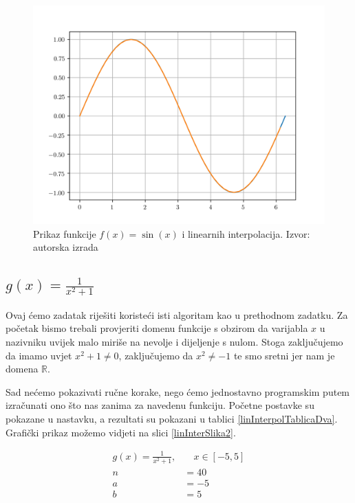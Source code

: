 \documentclass[12pt,a4paper]{report}
\begin{document}
		\begin{figure}[H]
			\includegraphics[width=\textwidth]{slike/usporedbaLinearneInterpolacijeSin.png}
			\caption{Prikaz funkcije $f(x)=\sin (x)$ i linearnih interpolacija. Izvor: autorska izrada}
		\end{figure}
		\subsection{$g(x)=\frac{1}{x^2 +1}$}
			Ovaj ćemo zadatak riješiti koristeći isti algoritam kao u prethodnom zadatku. Za početak bismo trebali provjeriti domenu funkcije s obzirom da varijabla $x$ u nazivniku uvijek malo miriše na nevolje i dijeljenje s nulom. Stoga zaključujemo da imamo uvjet $x^2+1\neq0$, zaključujemo da $x^2\neq-1$ te smo sretni jer nam je domena $\mathbb{R}$.
			
			Sad nećemo pokazivati ručne korake, nego ćemo jednostavno programskim putem izračunati ono što nas zanima za navedenu funkciju. Početne postavke su pokazane u nastavku, a rezultati su pokazani u tablici \ref{linInterpolTablicaDva}. Grafički prikaz možemo vidjeti na slici \ref{linInterSlika2}.
			
			\begin{align*}
			g(x)=\frac{1}{x^2 +1},& \quad x\in [-5,5]\\
			n&=40\\
			a&=-5\\
			b&=5\\
			\end{align*}
			
\end{document}
